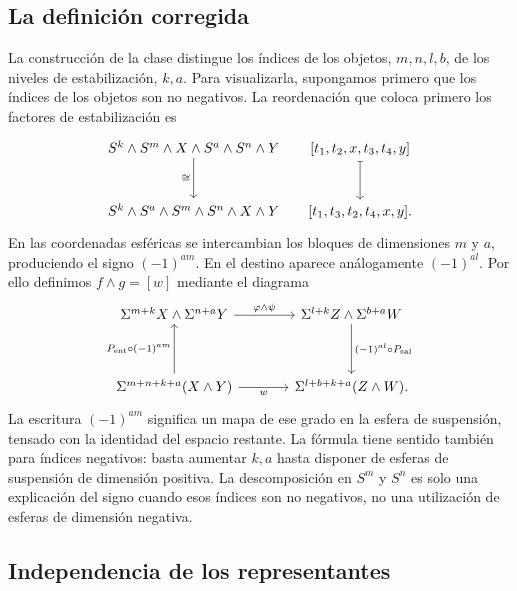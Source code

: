 \subsection{La definición corregida}

La construcción de la clase distingue los índices de los objetos, $m,n,l,b$, de los niveles de estabilización, $k,a$. Para visualizarla, supongamos primero que los índices de los objetos son no negativos. La reordenación que coloca primero los factores de estabilización es
\[
\begin{tikzcd}[column sep=small,row sep=large]
S^k\wedge S^m\wedge X\wedge S^a\wedge S^n\wedge Y \arrow[d,"\cong"'] & {[t_1,t_2,x,t_3,t_4,y]} \arrow[d,mapsto]\\
S^k\wedge S^a\wedge S^m\wedge S^n\wedge X\wedge Y & {[t_1,t_3,t_2,t_4,x,y]}.
\end{tikzcd}
\]
En las coordenadas esféricas se intercambian los bloques de dimensiones $m$ y $a$, produciendo el signo $(-1)^{am}$. En el destino aparece análogamente $(-1)^{al}$. Por ello definimos $f\wedge g=[w]$ mediante el diagrama
\[
\begin{tikzcd}[column sep=large,row sep=huge]
\Sigma^{m+k}X\wedge\Sigma^{n+a}Y \arrow[r,"\varphi\wedge\psi"] & \Sigma^{l+k}Z\wedge\Sigma^{b+a}W \arrow[d,"(-1)^{al}\circ P_{\rm sal}"]\\
\Sigma^{m+n+k+a}(X\wedge Y) \arrow[u,"P_{\rm ent}\circ(-1)^{am}"] \arrow[r,"w"'] & \Sigma^{l+b+k+a}(Z\wedge W).
\end{tikzcd}
\]
La escritura $(-1)^{am}$ significa un mapa de ese grado en la esfera de suspensión, tensado con la identidad del espacio restante. La fórmula tiene sentido también para índices negativos: basta aumentar $k,a$ hasta disponer de esferas de suspensión de dimensión positiva. La descomposición en $S^m$ y $S^n$ es solo una explicación del signo cuando esos índices son no negativos, no una utilización de esferas de dimensión negativa.

\subsection{Independencia de los representantes}

